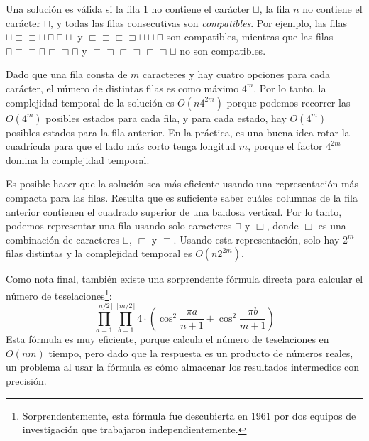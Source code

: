 Una solución es válida si la fila $1$ no contiene
el carácter $\sqcup$,
la fila $n$ no contiene el carácter $\sqcap$,
y todas las filas consecutivas son \emph{compatibles}.
Por ejemplo, las filas
$\sqcup \sqsubset \sqsupset \sqcup \sqcap \sqcap \sqcup$ y
$\sqsubset \sqsupset \sqsubset \sqsupset \sqcup \sqcup \sqcap$ 
son compatibles, mientras que las filas
$\sqcap \sqsubset \sqsupset \sqcap \sqsubset \sqsupset \sqcap$ y
$\sqsubset \sqsupset \sqsubset \sqsupset \sqsubset \sqsupset \sqcup$
no son compatibles.

Dado que una fila consta de $m$ caracteres y hay
cuatro opciones para cada carácter, el número de distintas
filas es como máximo $4^m$.
Por lo tanto, la complejidad temporal de la solución es
$O(n 4^{2m})$ porque podemos recorrer las
$O(4^m)$ posibles estados para cada fila,
y para cada estado, hay $O(4^m)$
posibles estados para la fila anterior.
En la práctica, es una buena idea rotar la cuadrícula
para que el lado más corto tenga longitud $m$,
porque el factor $4^{2m}$ domina la complejidad temporal.

Es posible hacer que la solución sea más eficiente
usando una representación más compacta para las filas.
Resulta que es suficiente saber cuáles
columnas de la fila anterior contienen el cuadrado superior
de una baldosa vertical.
Por lo tanto, podemos representar una fila usando solo caracteres
$\sqcap$ y $\Box$, donde $\Box$ es una combinación
de caracteres
$\sqcup$, $\sqsubset$ y $\sqsupset$.
Usando esta representación, solo hay
$2^m$ filas distintas y la complejidad temporal es
$O(n 2^{2m})$.

Como nota final, también existe una sorprendente fórmula directa
para calcular el número de teselaciones\footnote{Sorprendentemente,
esta fórmula fue descubierta en 1961 por dos equipos de investigación \cite{kas61,tem61}
que trabajaron independientemente.}:
\[ \prod_{a=1}^{\lceil n/2 \rceil} \prod_{b=1}^{\lceil m/2 \rceil} 4 \cdot (\cos^2 \frac{\pi a}{n + 1} + \cos^2 \frac{\pi b}{m+1})\]
Esta fórmula es muy eficiente, porque calcula
el número de teselaciones en $O(nm)$ tiempo,
pero dado que la respuesta es un producto de números reales,
un problema al usar la fórmula es
cómo almacenar los resultados intermedios con precisión.
